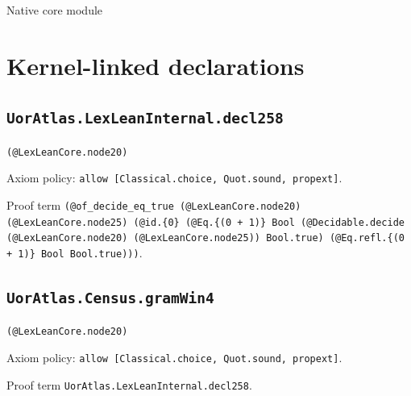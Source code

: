 \documentclass[11pt]{article}
\begin{document}
\begin{center}{\LARGE Native core module}\end{center}
\section*{Kernel-linked declarations}
\subsection*{\texttt{UorAtlas.LexLeanInternal.decl258}}
\noindent\texttt{(@LexLeanCore.node20)}\par
\noindent Axiom policy: \texttt{allow [Classical.choice, Quot.sound, propext]}.\par
\noindent Proof term \texttt{(@of\_decide\_eq\_true (@LexLeanCore.node20) (@LexLeanCore.node25) (@id.\{0\} (@Eq.\{(0 + 1)\} Bool (@Decidable.decide (@LexLeanCore.node20) (@LexLeanCore.node25)) Bool.true) (@Eq.refl.\{(0 + 1)\} Bool Bool.true)))}.\par
\subsection*{\texttt{UorAtlas.Census.gramWin4}}
\noindent\texttt{(@LexLeanCore.node20)}\par
\noindent Axiom policy: \texttt{allow [Classical.choice, Quot.sound, propext]}.\par
\noindent Proof term \texttt{UorAtlas.LexLeanInternal.decl258}.\par
\end{document}
